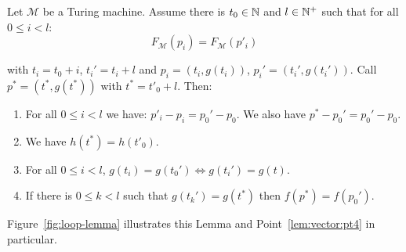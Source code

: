 \begin{lemma}\label{lem:vector} Let $\mathcal{M}$ be a Turing machine.
    Assume there is $ t_0 \in \mathbb{N}$ and $l \in \mathbb{N}^+$ such that
    for all $0 \leq i < l$: $$F_\mathcal{M}(p_i)   = F_\mathcal{M}(p'_i)$$

    with $t_i = t_0 + i$, $t_i' = t_i+l$ and $p_i = (t_i, g(t_i))$, $p_i' = (t_i', g(t_i'))$. Call $p^*=(t^*,g(t^*))$ with $t^*=t'_0 + l$. Then:
    \begin{enumerate}
        \item For all $0 \leq i < l$ we have: $p'_i - p_i = p_0' - p_0$. We also have $p^* - p_0' = p_0' - p_0$. \label{lem:vector:pt1}
        \item We have $h(t^*) = h(t'_0)$.\label{lem:vector:pt2}
        \item For all  $0 \leq i < l$, $g(t_i) = g(t_0') \Leftrightarrow g(t_i') = g(t)$.\label{lem:vector:pt3}
        \item If there is $0 \leq k < l$ such that $g(t_k') = g(t^*)$ then $f(p^*) = f(p_0')$.\label{lem:vector:pt4}
    \end{enumerate}
    Figure~\ref{fig:loop-lemma} illustrates this Lemma and Point~\ref{lem:vector:pt4} in particular.
\end{lemma}

